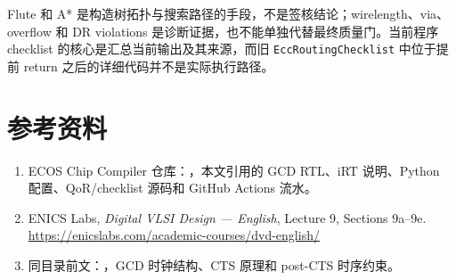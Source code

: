 \documentclass[UTF8,a4paper,11pt,fontset=fandol]{ctexart}
\newcommand{\code}[1]{\nolinkurl{#1}}
\begin{document}
Flute 和 A* 是构造树拓扑与搜索路径的手段，不是签核结论；wirelength、via、overflow 和 DR violations 是诊断证据，也不能单独代替最终质量门。当前程序 checklist 的核心是汇总当前输出及其来源，而旧 \code{EccRoutingChecklist} 中位于提前 return 之后的详细代码并不是实际执行路径。

\section*{参考资料}
\begin{enumerate}
  \item ECOS Chip Compiler 仓库：，本文引用的 GCD RTL、iRT 说明、Python 配置、QoR/checklist 源码和 GitHub Actions 流水。
  \item ENICS Labs, \emph{Digital VLSI Design --- English}, Lecture 9, Sections 9a--9e.\\
  \url{https://enicslabs.com/academic-courses/dvd-english/}
  \item 同目录前文：，GCD 时钟结构、CTS 原理和 post-CTS 时序约束。
\end{enumerate}
\end{document}
